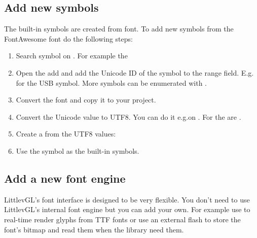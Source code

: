 \documentclass[letterpaper,10pt,english]{sphinxmanual}
\begin{document}
\subsection{Add new symbols}
\label{\detokenize{overview/fonts:add-new-symbols}}
The built-in symbols are created from  font. To add new symbols from the FontAwesome font do the following steps:
\begin{enumerate}
\def\theenumi{\arabic{enumi}}
\def\labelenumi{\theenumi .}
\makeatletter\def\p@enumii{\p@enumi \theenumi .}\makeatother
\item {} 
Search symbol on . For example the 

\item {} 
Open the  add  and add the Unicode ID of the symbol to the range field. E.g. for the USB symbol.
More symbols can be enumerated with \sphinxcode{\sphinxupquote{,}}.

\item {} 
Convert the font and copy it to your project.

\item {} 
Convert the Unicode value to UTF8. You can do it e.g.on . For  the  are .

\item {} 
Create a  from the UTF8 values: 

\item {} 
Use the symbol as the built-in symbols. 

\end{enumerate}


\subsection{Add a new font engine}
\label{\detokenize{overview/fonts:add-a-new-font-engine}}
LittlevGL’s font interface is designed to be very flexible.
You don’t need to use LittlevGL’s internal font engine but you can add your own.
For example use  to real-time render glyphs from TTF fonts or use an external flash to store the font’s bitmap and read them when the library need them.
\end{document}
